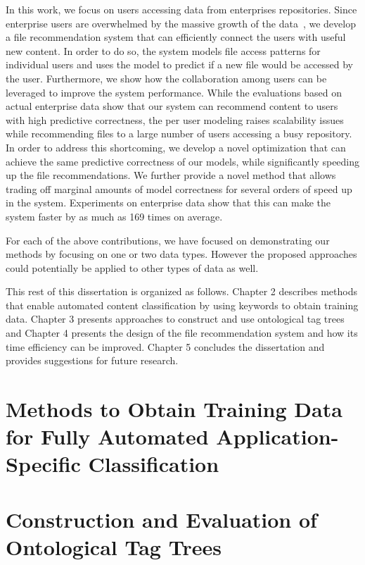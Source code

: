 \documentclass[12pt]{ucsddissertation}
\begin{document}
In this work, we focus on users accessing data from enterprises repositories. Since enterprise users are overwhelmed by the massive growth of the data~\cite{IDGBigDataSurvey14}, we develop a file recommendation system that can efficiently connect the users with useful new content. 
In order to do so, the system models file access patterns for individual users and uses the model to predict if a new file would be accessed by the user. 
Furthermore, we show how the collaboration among users can be leveraged to improve the system performance. 
While the evaluations based on actual enterprise data show that our system can recommend content to users with high predictive correctness, the per user modeling raises scalability issues while recommending files to a large number of users accessing a busy repository. 
In order to address this shortcoming, we develop a novel optimization that can achieve the same predictive correctness of our models, while significantly speeding up the file recommendations. We further provide a novel method that allows trading off marginal amounts of model correctness for several orders of speed up in the system. Experiments on enterprise data show that this can make the system faster by as much as 169 times on average. 


For each of the above contributions, we have focused on demonstrating our methods by focusing on one or two data types. However the proposed approaches could potentially be applied to other types of data as well. 

This rest of this dissertation is organized as follows. Chapter 2 describes methods that enable automated content classification by using keywords to obtain training data. Chapter 3 presents approaches to construct and use ontological tag trees and Chapter 4 presents the design of the file recommendation system and how its time efficiency can be improved. Chapter 5 concludes the dissertation and provides suggestions for future research. 



\chapter{Methods to Obtain Training Data for Fully Automated Application-Specific Classification}



\chapter{Construction and Evaluation of Ontological Tag Trees}

\end{document}
